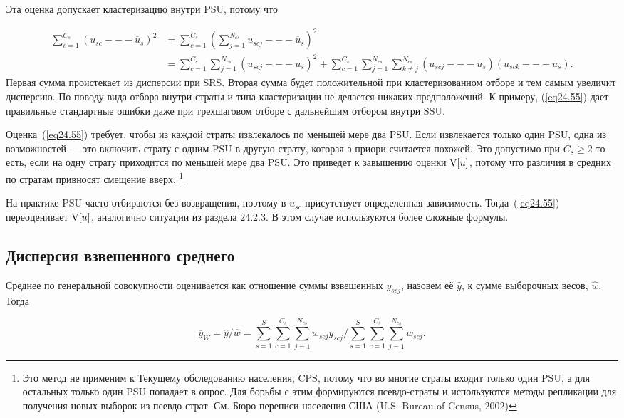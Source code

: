 Эта оценка допускает кластеризацию внутри PSU, потому что 

\begin{align}
\sum_{c=1}^{C_s} (u_{sc} --- \overline{u}_s)^2 & = \sum_{c=1}^{C_s} \left(  \sum_{j=1}^{N_{cs}} u_{scj} ---  \overline{u}_s \right)^2 \nonumber\\
& =\sum_{c=1}^{C_s} \sum_{j=1}^{N_{cs}} (u_{scj} --- \overline{u}_s)^2 + \sum_{c=1}^{C_s} \sum_{j=1}^{N_{cs}} \sum_{k \ne j}^{N_{cs}} (u_{scj} --- \overline{u}_s)(u_{sck} --- \overline{u}_s). \nonumber
\end{align}
Первая сумма проистекает из дисперсии при SRS. Вторая сумма будет положительной при кластеризованном отборе и тем самым увеличит дисперсию. По поводу вида отбора внутри страты и типа кластеризации не делается никаких предположений. К примеру, (\ref{eq24.55}) дает правильные стандартные ошибки даже при трехшаговом отборе с дальнейшим отбором внутри SSU. 

Оценка~(\ref{eq24.55}) требует, чтобы из каждой страты извлекалось по меньшей мере два PSU. Если извлекается только один PSU, одна из возможностей --- это включить страту с одним PSU в другую страту, которая а-приори считается похожей. Это допустимо при $C_s \ge 2$ то есть, если на одну страту приходится по меньшей мере два PSU. Это приведет к завышению оценки $\mathrm{V}[u]$, потому что различия в средних по стратам привносят смещение вверх. \footnote{Это метод не применим к Текущему обследованию населения, CPS, потому что во многие страты входит только один PSU, а для остальных только один PSU попадает в опрос. Для борьбы с этим формируются псевдо-страты и используются методы репликации для получения новых выборок из псевдо-страт. См. Бюро переписи населения США (U.S. Bureau of Census, 2002)}

На практике PSU часто отбираются без возвращения, поэтому в $u_{sc}$ присутствует определенная зависимость. Тогда~(\ref{eq24.55}) переоценивает $\mathrm{V}[u]$, аналогично ситуации из раздела 24.2.3. В этом случае используются более сложные формулы. 

\subsection*{Дисперсия взвешенного среднего}

Среднее по генеральной совокупности оценивается как отношение суммы взвешенных $y_{scj}$, назовем её $\hat y$, к сумме выборочных весов, $\hat w$. Тогда

$$
\overline{y}_W = \hat y / \hat w = \sum_{s=1}^S \sum_{c=1}^{C_s} \sum_{j=1}^{N_{cs}} w_{scj} y_{scj} \bigl/  \sum_{s=1}^S \sum_{c=1}^{C_s} \sum_{j=1}^{N_{cs}} w_{scj}.
$$

